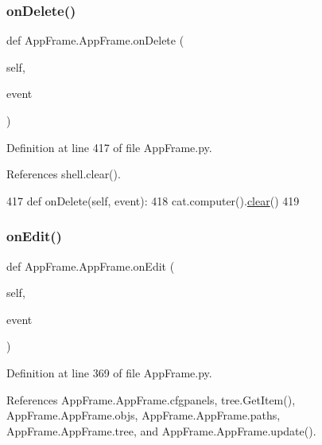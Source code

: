 \subsubsection{\texorpdfstring{on\+Delete()}{onDelete()}}
{\footnotesize\ttfamily def App\+Frame.\+App\+Frame.\+on\+Delete (\begin{DoxyParamCaption}\item[{}]{self,  }\item[{}]{event }\end{DoxyParamCaption})}



Definition at line 417 of file App\+Frame.\+py.



References shell.\+clear().


\begin{DoxyCode}
417     \textcolor{keyword}{def }onDelete(self, event):
418         cat.computer().\hyperlink{namespaceshell_a14da1173b3cc5b8569cc0020130e3bd7}{clear}()        
419         
\end{DoxyCode}
\mbox{\label{classAppFrame_1_1AppFrame_ae6524f7daa824546661b4824a2ae7606}} 
\subsubsection{\texorpdfstring{on\+Edit()}{onEdit()}}
{\footnotesize\ttfamily def App\+Frame.\+App\+Frame.\+on\+Edit (\begin{DoxyParamCaption}\item[{}]{self,  }\item[{}]{event }\end{DoxyParamCaption})}



Definition at line 369 of file App\+Frame.\+py.



References App\+Frame.\+App\+Frame.\+cfgpanels, tree.\+Get\+Item(), App\+Frame.\+App\+Frame.\+objs, App\+Frame.\+App\+Frame.\+paths, App\+Frame.\+App\+Frame.\+tree, and App\+Frame.\+App\+Frame.\+update().


